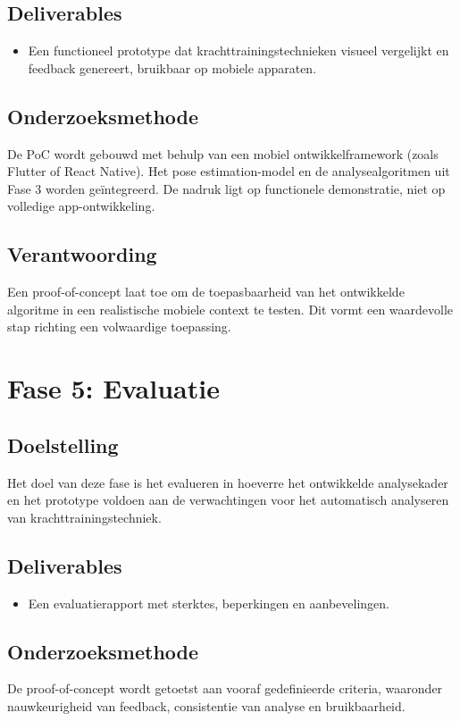 \subsection{Deliverables}
\begin{itemize}
    \item Een functioneel prototype dat krachttrainingstechnieken visueel vergelijkt en feedback genereert, bruikbaar op mobiele apparaten.
\end{itemize}

\subsection{Onderzoeksmethode}
De PoC wordt gebouwd met behulp van een mobiel ontwikkelframework (zoals Flutter of React Native). 
Het pose estimation-model en de analysealgoritmen uit Fase 3 worden geïntegreerd. 
De nadruk ligt op functionele demonstratie, niet op volledige app-ontwikkeling.

\subsection{Verantwoording}
Een proof-of-concept laat toe om de toepasbaarheid van het ontwikkelde algoritme in een realistische mobiele context te testen. 
Dit vormt een waardevolle stap richting een volwaardige toepassing.

\section{Fase 5: Evaluatie}
\subsection{Doelstelling}
Het doel van deze fase is het evalueren in hoeverre het ontwikkelde analysekader en het prototype voldoen aan de verwachtingen voor het automatisch analyseren van krachttrainingstechniek.

\subsection{Deliverables}
\begin{itemize}
    \item Een evaluatierapport met sterktes, beperkingen en aanbevelingen.
\end{itemize}

\subsection{Onderzoeksmethode}
De proof-of-concept wordt getoetst aan vooraf gedefinieerde criteria, waaronder nauwkeurigheid van feedback, consistentie van analyse en bruikbaarheid. 

